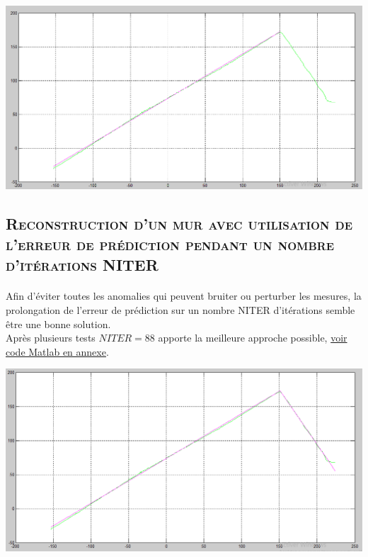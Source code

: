  \begin{center}
	\includegraphics[scale=0.5]{3_b.PNG}
	\label{fig5} 
	\end{center}
	
\subsection{\textsc{ Reconstruction d'un mur avec utilisation de l'erreur de prédiction pendant un nombre d'itérations NITER}}
  
  \paragraph{} Afin d'éviter toutes les anomalies qui peuvent bruiter ou perturber les mesures, la prolongation de l'erreur de prédiction sur un nombre NITER d'itérations semble être une bonne solution.\\
  Après plusieurs tests $NITER = 88$ apporte la meilleure approche possible, \label{section 1.3.3} \hyperref[Annexe D] {voir code Matlab en annexe}. \\
  
	\begin{center}
	\includegraphics[scale=0.5]{NITER.PNG}
	\label{fig6} 
	\end{center}
   
